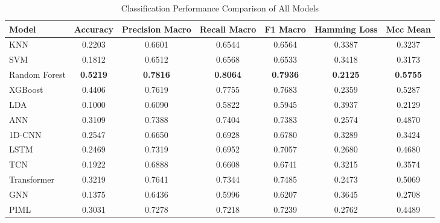 \begin{table}[htbp]
\centering
\caption{Classification Performance Comparison of All Models}
\label{tab:classification_all}
\begin{tabular}{lcccccc}
\toprule
Model & Accuracy & Precision Macro & Recall Macro & F1 Macro & Hamming Loss & Mcc Mean \\
\midrule
KNN & 0.2203 & 0.6601 & 0.6544 & 0.6564 & 0.3387 & 0.3237 \\
SVM & 0.1812 & 0.6512 & 0.6568 & 0.6533 & 0.3418 & 0.3173 \\
Random Forest & \textbf{0.5219} & \textbf{0.7816} & \textbf{0.8064} & \textbf{0.7936} & \textbf{0.2125} & \textbf{0.5755} \\
XGBoost & 0.4406 & 0.7619 & 0.7755 & 0.7683 & 0.2359 & 0.5287 \\
LDA & 0.1000 & 0.6090 & 0.5822 & 0.5945 & 0.3937 & 0.2129 \\
ANN & 0.3109 & 0.7388 & 0.7404 & 0.7383 & 0.2574 & 0.4870 \\
1D-CNN & 0.2547 & 0.6650 & 0.6928 & 0.6780 & 0.3289 & 0.3424 \\
LSTM & 0.2469 & 0.7319 & 0.6952 & 0.7057 & 0.2680 & 0.4680 \\
TCN & 0.1922 & 0.6888 & 0.6608 & 0.6741 & 0.3215 & 0.3574 \\
Transformer & 0.3219 & 0.7641 & 0.7344 & 0.7485 & 0.2473 & 0.5069 \\
GNN & 0.1375 & 0.6436 & 0.5996 & 0.6207 & 0.3645 & 0.2708 \\
PIML & 0.3031 & 0.7278 & 0.7218 & 0.7239 & 0.2762 & 0.4489 \\
\bottomrule
\end{tabular}
\end{table}
